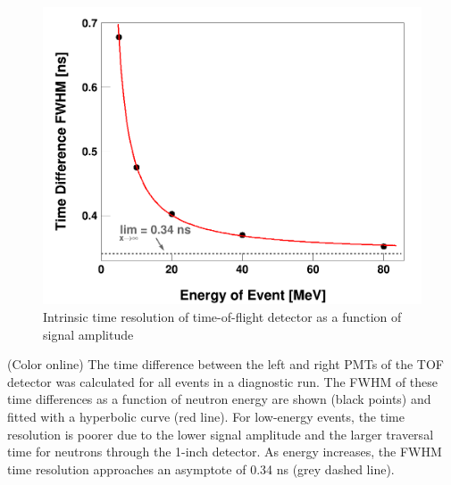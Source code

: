 \begin{figure}
    \includegraphics[scale=0.3]{figures/DifferenceThresholdsFit.png}
    \caption{Intrinsic time resolution of time-of-flight detector as a function of signal amplitude}
    \label{DifferenceThresholdsFit}
\end{figure}

(Color online) The time difference between the left and right PMTs
        of the TOF detector was calculated for all events in a diagnostic run.
        The FWHM of these time differences as a function of
        neutron energy are shown (black points) and fitted with a hyperbolic
        curve (red line). For low-energy
        events, the time resolution is poorer due to the lower signal amplitude and
        the larger traversal time for neutrons through the 1-inch detector. As energy
        increases, the FWHM time resolution approaches an asymptote of 0.34
    ns (grey dashed line).

